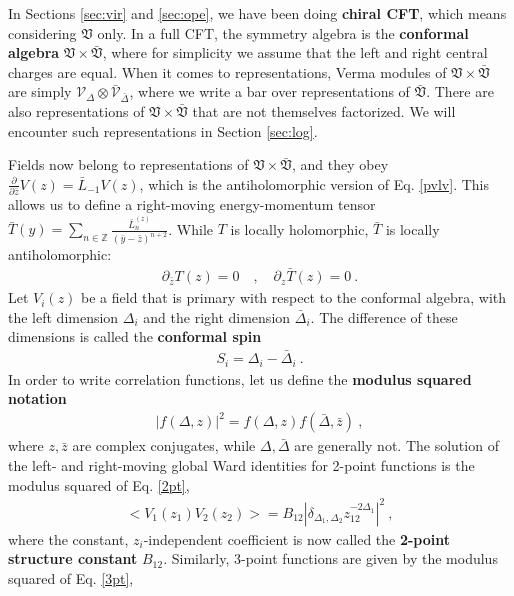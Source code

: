 \documentclass[12pt, a4paper]{article}
\theoremstyle{break}
\begin{document}
In Sections \ref{sec:vir} and \ref{sec:ope}, we have been doing \textbf{chiral CFT}, which means considering $\mathfrak{V}$ only. In a full CFT, the symmetry algebra is the \textbf{conformal algebra} $\mathfrak{V}\times \bar{\mathfrak{V}}$, where for simplicity we assume that the left and right central charges are equal. When it comes to representations, Verma modules of $\mathfrak{V}\times \bar{\mathfrak{V}}$ are simply $\mathcal{V}_\Delta\otimes \bar{\mathcal{V}}_{\bar \Delta}$, where we write a bar over representations of $\bar{\mathfrak{V}}$. There are also representations of $\mathfrak{V}\times \bar{\mathfrak{V}}$ that are not themselves factorized. We will encounter such representations in Section \ref{sec:log}. 

Fields now belong to representations of $\mathfrak{V}\times \bar{\mathfrak{V}}$, and they obey $\frac{\partial}{\partial \bar z} V(z) = \bar L_{-1} V(z)$, which is the antiholomorphic version of Eq. \eqref{pvlv}. This allows us to define a right-moving energy-momentum tensor $\bar T(y) = \sum_{n\in\mathbb{Z}} \frac{\bar L_n^{(z)}}{(\bar y-\bar z)^{n+2}}$. While $T$ is locally holomorphic, $\bar T$ is locally antiholomorphic:
\begin{align}
 \partial_{\bar z} T(z) = 0 \quad , \quad \partial_z \bar T(z) = 0 \ . 
\end{align}
Let $V_i(z)$ be a field that is primary with respect to the conformal algebra, with the left dimension $\Delta_i$ and the right dimension $\bar\Delta_i$. The difference of these dimensions is called the \textbf{conformal spin}
\begin{align}
 S_i = \Delta_i -\bar\Delta_i\ . 
 \label{sdd} 
\end{align}
In order to write correlation functions, let us define the \textbf{modulus squared notation} 
\begin{align}
 \left| f(\Delta, z)\right|^2 = f(\Delta, z)f(\bar\Delta,\bar z)\ ,
 \label{fdz2}
\end{align}
where $z,\bar z$ are complex conjugates, while $\Delta,\bar\Delta$ are generally not. The solution of the left- and right-moving global Ward identities for 2-point functions is the modulus squared of Eq. \eqref{2pt},
\begin{align}
\boxed{ \Big< V_1(z_1)V_2(z_2) \Big> = B_{12} \left|\delta_{\Delta_1,\Delta_2} z_{12}^{-2\Delta_1}\right|^2} \ ,
\label{2ptb}
\end{align}
where the constant, $z_i$-independent coefficient is now called the \textbf{2-point structure constant} $B_{12}$. Similarly, 3-point functions are given by the modulus squared of Eq. \eqref{3pt},
\end{document}
